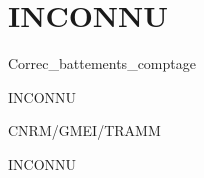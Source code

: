 %
\section{INCONNU}

 {\sf Correc\_battements\_comptage}

INCONNU

\bigskip





CNRM/GMEI/TRAMM

INCONNU
